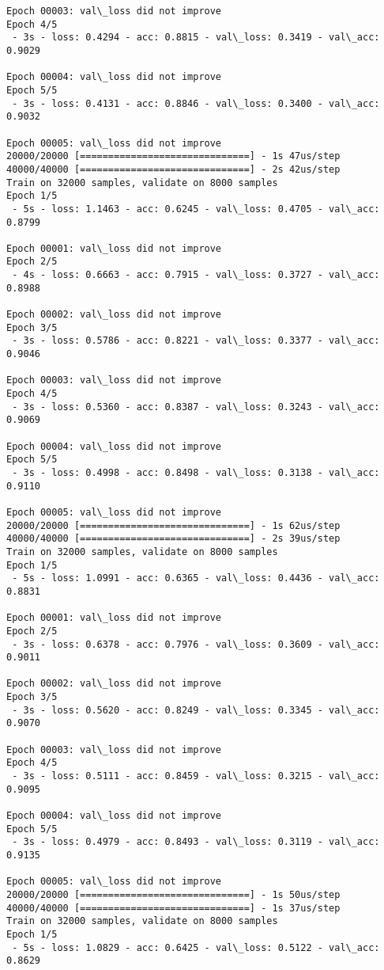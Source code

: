 \documentclass[11pt]{article}
\begin{document}
\begin{Verbatim}[commandchars=\\\{\}]
Epoch 00003: val\_loss did not improve
Epoch 4/5
 - 3s - loss: 0.4294 - acc: 0.8815 - val\_loss: 0.3419 - val\_acc: 0.9029

Epoch 00004: val\_loss did not improve
Epoch 5/5
 - 3s - loss: 0.4131 - acc: 0.8846 - val\_loss: 0.3400 - val\_acc: 0.9032

Epoch 00005: val\_loss did not improve
20000/20000 [==============================] - 1s 47us/step
40000/40000 [==============================] - 2s 42us/step
Train on 32000 samples, validate on 8000 samples
Epoch 1/5
 - 5s - loss: 1.1463 - acc: 0.6245 - val\_loss: 0.4705 - val\_acc: 0.8799

Epoch 00001: val\_loss did not improve
Epoch 2/5
 - 4s - loss: 0.6663 - acc: 0.7915 - val\_loss: 0.3727 - val\_acc: 0.8988

Epoch 00002: val\_loss did not improve
Epoch 3/5
 - 3s - loss: 0.5786 - acc: 0.8221 - val\_loss: 0.3377 - val\_acc: 0.9046

Epoch 00003: val\_loss did not improve
Epoch 4/5
 - 3s - loss: 0.5360 - acc: 0.8387 - val\_loss: 0.3243 - val\_acc: 0.9069

Epoch 00004: val\_loss did not improve
Epoch 5/5
 - 3s - loss: 0.4998 - acc: 0.8498 - val\_loss: 0.3138 - val\_acc: 0.9110

Epoch 00005: val\_loss did not improve
20000/20000 [==============================] - 1s 62us/step
40000/40000 [==============================] - 2s 39us/step
Train on 32000 samples, validate on 8000 samples
Epoch 1/5
 - 5s - loss: 1.0991 - acc: 0.6365 - val\_loss: 0.4436 - val\_acc: 0.8831

Epoch 00001: val\_loss did not improve
Epoch 2/5
 - 3s - loss: 0.6378 - acc: 0.7976 - val\_loss: 0.3609 - val\_acc: 0.9011

Epoch 00002: val\_loss did not improve
Epoch 3/5
 - 3s - loss: 0.5620 - acc: 0.8249 - val\_loss: 0.3345 - val\_acc: 0.9070

Epoch 00003: val\_loss did not improve
Epoch 4/5
 - 3s - loss: 0.5111 - acc: 0.8459 - val\_loss: 0.3215 - val\_acc: 0.9095

Epoch 00004: val\_loss did not improve
Epoch 5/5
 - 3s - loss: 0.4979 - acc: 0.8493 - val\_loss: 0.3119 - val\_acc: 0.9135

Epoch 00005: val\_loss did not improve
20000/20000 [==============================] - 1s 50us/step
40000/40000 [==============================] - 1s 37us/step
Train on 32000 samples, validate on 8000 samples
Epoch 1/5
 - 5s - loss: 1.0829 - acc: 0.6425 - val\_loss: 0.5122 - val\_acc: 0.8629


\end{Verbatim}
\end{document}
